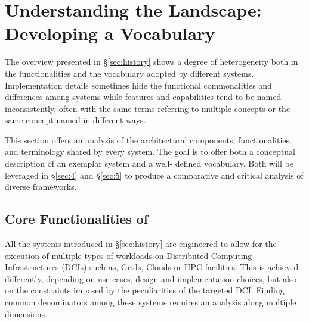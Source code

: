 \documentclass{sig-alternate}
\begin{document}

\section{Understanding the Landscape: Developing a Vocabulary}
\label{sec:vocab}

The overview presented in \S\ref{sec:history} shows a degree of heterogeneity
both in the functionalities and the vocabulary adopted by different \pilotjob
systems. Implementation details sometimes hide the functional commonalities and
differences among \pilotjobs systems while features and capabilities tend to be
named inconsistently, often with the same terms referring to multiple concepts
or the same concept named in different ways.

This section offers an analysis of the architectural components,
functionalities, and terminology shared by every \pilotjob system.  The goal is
to offer both a conceptual description of an exemplar \pilotjob system and a
well- defined vocabulary. Both will be leveraged in \S\ref{sec:4} and
\S\ref{sec:5} to produce a comparative and critical analysis of diverse
\pilotjob frameworks.

\subsection{Core Functionalities of \pilotjobs}
\label{subsec:vocab_core_functionalities}

All the \pilotjob systems introduced in \S\ref{sec:history} are engineered to
allow for the execution of multiple types of workloads on Distributed Computing
Infrastructures (DCIs) such as, Grids, Clouds or HPC facilities. This is
achieved differently, depending on use cases, design and implementation
choices, but also on the constraints imposed by the peculiarities of the
targeted DCI. Finding common denominators among these systems requires an
analysis along multiple dimensions.

\end{document}
